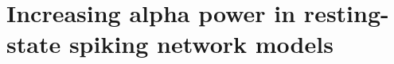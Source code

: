 \documentclass[../main.tex]{subfiles}
\begin{document}
\chapter{Increasing alpha power in resting-state spiking network models}




\end{document}
